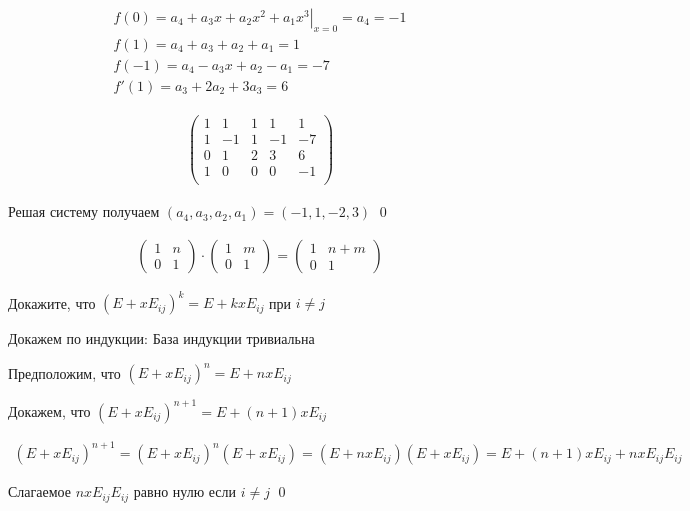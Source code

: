 \begin{sol}[Сергей Б.]
\begin{gather*}
   \left. f(0) = a_4 + a_3 x + a_2 x^2 + a_1 x^3 \right\vert_{x = 0} = a_4 = -1 \\
   f(1) = a_4 + a_3 + a_2 + a_1 = 1 \\
   f(-1) = a_4 - a_3 x + a_2 -  a_1 = -7 \\
   f'(1) =  a_3 + 2 a_2 + 3 a_3  = 6
\end{gather*}

\begin{gather*}
    \left(
    \begin{array}{cccc|c}
     1 & 1 & 1 & 1 & 1 \\
     1 & -1 & 1 & -1 & -7 \\
     0 & 1 & 2 & 3 & 6 \\
     1 & 0 & 0 & 0 & -1 \\
    \end{array}
    \right)
\end{gather*}

Решая систему получаем $\left(a_4, a_3, a_2, a_1\right) = \left(-1, 1, -2, 3\right)$
\qed
\end{sol}

\begin{nb}

\begin{gather*}
    \left(
    \begin{array}{cc}
    1 & n \\
    0 & 1
    \end{array}
    \right)
    \cdot
    \left(
    \begin{array}{cc}
    1 & m \\
    0 & 1
    \end{array}
    \right) =
    \left(
    \begin{array}{cc}
    1 & n + m \\
    0 & 1
    \end{array}
    \right)
\end{gather*}
\end{nb}

\begin{prb}
Докажите, что $\left(E +  x E_{ij}\right)^k = E +  k x E_{ij}$ при $i \neq j$
\end{prb}

\begin{sol}
Докажем по индукции:
База индукции тривиальна

Предположим, что $\left(E +  x E_{ij}\right)^n = E +  n x E_{ij}$

Докажем, что $\left(E +  x E_{ij}\right)^{n + 1} = E +  (n + 1 )x E_{ij}$

\begin{gather*}
    \left(E +  x E_{ij}\right)^{n + 1} = \left(E +  x E_{ij}\right)^{n} \left(E +  x E_{ij}\right) = \left(E +  n x E_{ij}\right) \left(E +  x E_{ij}\right) = E + (n + 1) x E_{ij} + nx E_{ij}E_{ij} 
\end{gather*}

Слагаемое $nx E_{ij}E_{ij}$ равно нулю если $i \neq j$ \qed

\end{sol}

